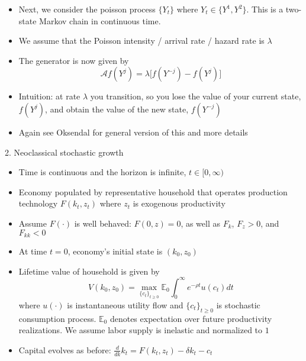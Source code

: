 \documentclass[10pt]{beamer}
\begin{document}
\begin{frame}{}
\begin{itemize}
\item Next, we consider the poisson process $\{ Y_t \}$ where $Y_t \in \{ Y^1, Y^2 \}$. This is a two-state Markov chain in continuous time.

\item We assume that the Poisson intensity / arrival rate / hazard rate is $\lambda$

\item The generator is now given by
\begin{equation*}
	\mathcal A f (Y^j) = \lambda \Big[ f( Y^{-j} ) - f (Y^j) \Big]
\end{equation*}

\item Intuition: at rate $\lambda$ you transition, so you lose the value of your current state, $f(Y^j)$, and obtain the value of the new state, $f(Y^{-j})$

\item Again see Oksendal for general version of this and more details
\end{itemize}
\end{frame}




\begin{frame}{2. Neoclassical stochastic growth}
\begin{itemize}
\item Time is continuous and the horizon is infinite, $t \in [0, \infty)$

\item Economy populated by representative household that operates production technology $F(k_t, z_t)$ where $z_t$ is exogenous productivity

\item Assume $F(\cdot)$ is well behaved: $F(0, z) = 0$, as well as $F_k$, $F_z > 0$, and $F_{kk} < 0$

\item At time $t = 0$, economy's initial state is $(k_0, z_0)$

\item Lifetime value of household is given by
\begin{equation*}
	V(k_0, z_0) = \max_{ \{c_t\}_{t \geq 0}} \mathbb{E}_0 \int_0^\infty e^{- \rho t} u(c_t) dt 
\end{equation*}
where $u(\cdot)$ is instantaneous utility flow and $\{ c_t \}_{t \geq 0}$ is stochastic consumption process. $\mathbb{E}_0$ denotes expectation over future productivity realizations. We assume labor supply is inelastic and normalized to $1$

\item Capital evolves as before: $\frac{d}{dk} k_t = F(k_t, z_t) - \delta k_t - c_t$
\end{itemize}
\end{frame}
\end{document}
